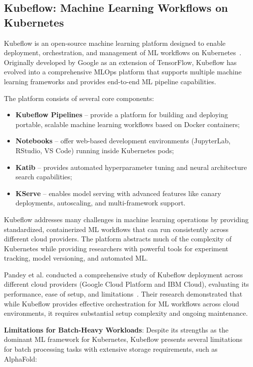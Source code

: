 \subsection{Kubeflow: Machine Learning Workflows on Kubernetes}

Kubeflow is an open-source machine learning platform designed to enable deployment, orchestration, and management of ML workflows on Kubernetes~\cite{kubeflow,kubeflow_deployment_study}.
Originally developed by Google as an extension of TensorFlow, Kubeflow has evolved into a comprehensive MLOps platform that supports multiple machine learning frameworks and provides end-to-end ML pipeline capabilities.

The platform consists of several core components:
\begin{itemize}
    \item \textbf{Kubeflow Pipelines} -- provide a platform for building and deploying portable, scalable machine learning workflows based on Docker containers;
    \item \textbf{Notebooks} -- offer web-based development environments (JupyterLab, RStudio, VS Code) running inside Kubernetes pods;
    \item \textbf{Katib} -- provides automated hyperparameter tuning and neural architecture search capabilities;
    \item \textbf{KServe} -- enables model serving with advanced features like canary deployments, autoscaling, and multi-framework support.
\end{itemize}

Kubeflow addresses many challenges in machine learning operations by providing standardized, containerized ML workflows that can run consistently across different cloud providers.
The platform abstracts much of the complexity of Kubernetes while providing researchers with powerful tools for experiment tracking, model versioning, and automated ML.

Pandey et al. conducted a comprehensive study of Kubeflow deployment across different cloud providers (Google Cloud Platform and IBM Cloud), evaluating its performance, ease of setup, and limitations~\cite{kubeflow_deployment_study}.
Their research demonstrated that while Kubeflow provides effective orchestration for ML workflows across cloud environments, it requires substantial setup complexity and ongoing maintenance.

\textbf{Limitations for Batch-Heavy Workloads}: Despite its strengths as the dominant ML framework for Kubernetes, Kubeflow presents several limitations for batch processing tasks with extensive storage requirements, such as AlphaFold:

